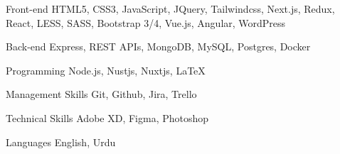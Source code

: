 

\begin{cvskills}

  \cvskill
    {Front-end} %
    {HTML5, CSS3, JavaScript, JQuery, Tailwindcss, Next.js, Redux, React, LESS, SASS, Bootstrap 3/4, Vue.js, Angular, WordPress} %

  \cvskill
    {Back-end} %
    {Express, REST APIs, MongoDB, MySQL, Postgres, Docker } %

  \cvskill
    {Programming} %
    {Node.js, Nustjs, Nuxtjs, LaTeX} %

  \cvskill
    {Management Skills} %
    {Git, Github, Jira, Trello} %

  \cvskill
    {Technical Skills} %
    {Adobe XD, Figma, Photoshop} %

  \cvskill
    {Languages} %
    {English, Urdu} %

\end{cvskills}
